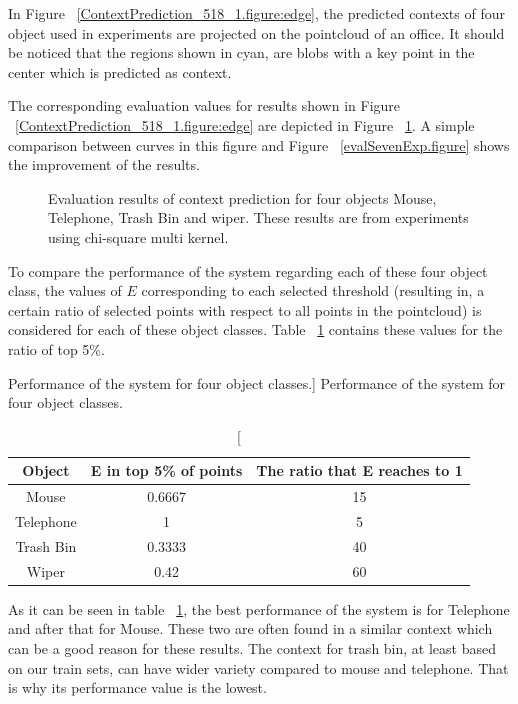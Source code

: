 In Figure ~\ref{ContextPrediction_518_1.figure:edge}, the predicted contexts of four object used in experiments 
are projected on the pointcloud of an office.
It should be noticed that the regions shown in cyan, are blobs with a key point in the center which is predicted as 
context.

The corresponding evaluation values for results shown in Figure ~\ref{ContextPrediction_518_1.figure:edge} are depicted
in Figure ~\ref{Eval_518_1.figure}.
A simple comparison between curves in this figure and Figure ~\ref{evalSevenExp.figure} shows the improvement of the 
results.

\begin{figure}
  \begin{center}
  \caption[Evaluation results for four object classes.]
  {Evaluation results of context prediction for four objects Mouse, Telephone, Trash Bin and wiper. These results are from experiments using chi-square multi kernel.}
  \label{Eval_518_1.figure}
  \end{center}
\end{figure}

To compare the performance of the system regarding each of these four object class, the values of $E$ corresponding to each selected threshold (resulting in, a certain ratio of selected points with respect to all points in the pointcloud) is considered for each of these object classes.
Table ~\ref{performance.table} contains these values for the ratio of top 5\%.

\begin{table}
\centering
\caption
[Performance of the system for four object classes.]
{Performance of the system for four object classes.}
\label{performance.table}
\begin{tabular}{|c|c|c|}
\hline
Object & E in top 5\% of points & The ratio that E reaches to 1 \\
\hline
      Mouse & 0.6667 & 15 \\
\hline
      Telephone & 1 & 5 \\
\hline
      Trash Bin & 0.3333 &  40\\
\hline
      Wiper & 0.42 & 60 \\
\hline
\end{tabular}
\end{table}

As it can be seen in table ~\ref{performance.table}, the best performance of the system is for Telephone and after 
that for Mouse.
These two are often found in a similar context which can be a good reason for these results.
The context for trash bin, at least based on our train sets, can have wider variety compared to mouse and telephone.
That is why its performance value is the lowest.


